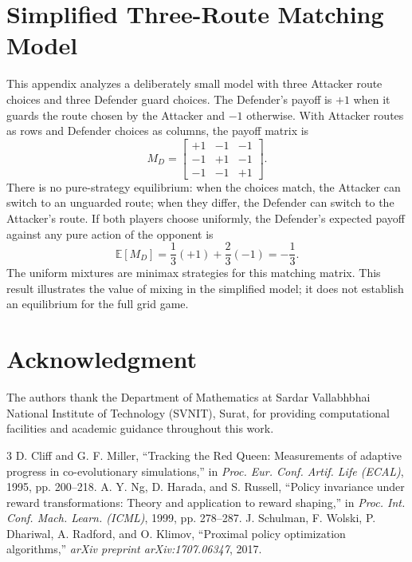 \documentclass[conference]{IEEEtran}
\begin{document}
\section{Simplified Three-Route Matching Model}
\label{app:matching}
This appendix analyzes a deliberately small model with three Attacker route choices and three Defender guard choices. The Defender's payoff is $+1$ when it guards the route chosen by the Attacker and $-1$ otherwise. With Attacker routes as rows and Defender choices as columns, the payoff matrix is
\begin{equation}
M_D = \begin{bmatrix} +1 & -1 & -1 \\ -1 & +1 & -1 \\ -1 & -1 & +1 \end{bmatrix}.
\end{equation}
There is no pure-strategy equilibrium: when the choices match, the Attacker can switch to an unguarded route; when they differ, the Defender can switch to the Attacker's route. If both players choose uniformly, the Defender's expected payoff against any pure action of the opponent is
\begin{equation}
\mathbb{E}[M_D] = \frac{1}{3}(+1)+\frac{2}{3}(-1)=-\frac{1}{3}.
\end{equation}
The uniform mixtures are minimax strategies for this matching matrix. This result illustrates the value of mixing in the simplified model; it does not establish an equilibrium for the full grid game.

\section*{Acknowledgment}
The authors thank the Department of Mathematics at Sardar Vallabhbhai National Institute of Technology (SVNIT), Surat, for providing computational facilities and academic guidance throughout this work.

\begin{thebibliography}{3}
 D. Cliff and G. F. Miller, ``Tracking the Red Queen: Measurements of adaptive progress in co-evolutionary simulations,'' in \textit{Proc. Eur. Conf. Artif. Life (ECAL)}, 1995, pp. 200--218.
 A. Y. Ng, D. Harada, and S. Russell, ``Policy invariance under reward transformations: Theory and application to reward shaping,'' in \textit{Proc. Int. Conf. Mach. Learn. (ICML)}, 1999, pp. 278--287.
 J. Schulman, F. Wolski, P. Dhariwal, A. Radford, and O. Klimov, ``Proximal policy optimization algorithms,'' \textit{arXiv preprint arXiv:1707.06347}, 2017.
\end{thebibliography}
\end{document}
